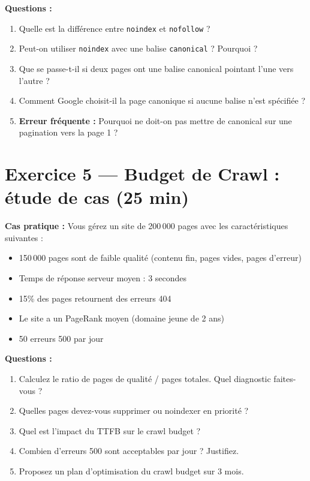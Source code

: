 \documentclass[12pt,a4paper]{report}
\begin{document}
\textbf{Questions :}
\begin{enumerate}
    \item Quelle est la diff\'{e}rence entre \texttt{noindex} et \texttt{nofollow} ?
    \item Peut-on utiliser \texttt{noindex} avec une balise \texttt{canonical} ? Pourquoi ?
    \item Que se passe-t-il si deux pages ont une balise canonical pointant l'une vers l'autre ?
    \item Comment Google choisit-il la page canonique si aucune balise n'est sp\'{e}cifi\'{e}e ?
    \item \textbf{Erreur fr\'{e}quente :} Pourquoi ne doit-on pas mettre de canonical sur une pagination vers la page 1 ?
\end{enumerate}

\section{Exercice 5 --- Budget de Crawl : \'{e}tude de cas (25 min)}

\textbf{Cas pratique :} Vous g\'{e}rez un site de 200\,000 pages avec les caract\'{e}ristiques suivantes :
\begin{itemize}
    \item 150\,000 pages sont de faible qualit\'{e} (contenu fin, pages vides, pages d'erreur)
    \item Temps de r\'{e}ponse serveur moyen : 3 secondes
    \item 15\% des pages retournent des erreurs 404
    \item Le site a un PageRank moyen (domaine jeune de 2 ans)
    \item 50 erreurs 500 par jour
\end{itemize}

\textbf{Questions :}
\begin{enumerate}
    \item Calculez le ratio de pages de qualit\'{e} / pages totales. Quel diagnostic faites-vous ?
    \item Quelles pages devez-vous supprimer ou noindexer en priorit\'{e} ?
    \item Quel est l'impact du TTFB sur le crawl budget ?
    \item Combien d'erreurs 500 sont acceptables par jour ? Justifiez.
    \item Proposez un plan d'optimisation du crawl budget sur 3 mois.
\end{enumerate}
\end{document}
